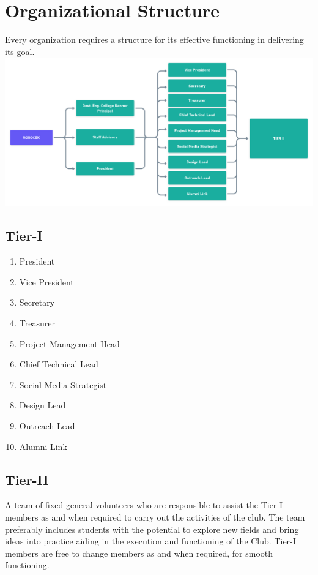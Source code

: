 \chapter{Organizational Structure}

Every organization requires a structure for its effective functioning in delivering its goal.\\
\includegraphics[width=\textwidth]{Images/OrganizationalChart.png}

\section{Tier-I}
\begin{enumerate}
	\itemsep0em 
	\item President
	\item Vice President
	\item Secretary
	\item Treasurer
	\item Project Management Head
	\item Chief Technical Lead
	\item Social Media Strategist
	\item Design Lead
	\item Outreach Lead
	\item Alumni Link
\end{enumerate}


\section{Tier-II}
A team of fixed general volunteers who are responsible to assist the Tier-I members as and when required to carry out the activities of the club. The team preferably includes students with the potential to explore new fields and bring ideas into practice aiding in the execution and functioning of the Club. Tier-I members are free to change members as and when required, for smooth functioning.